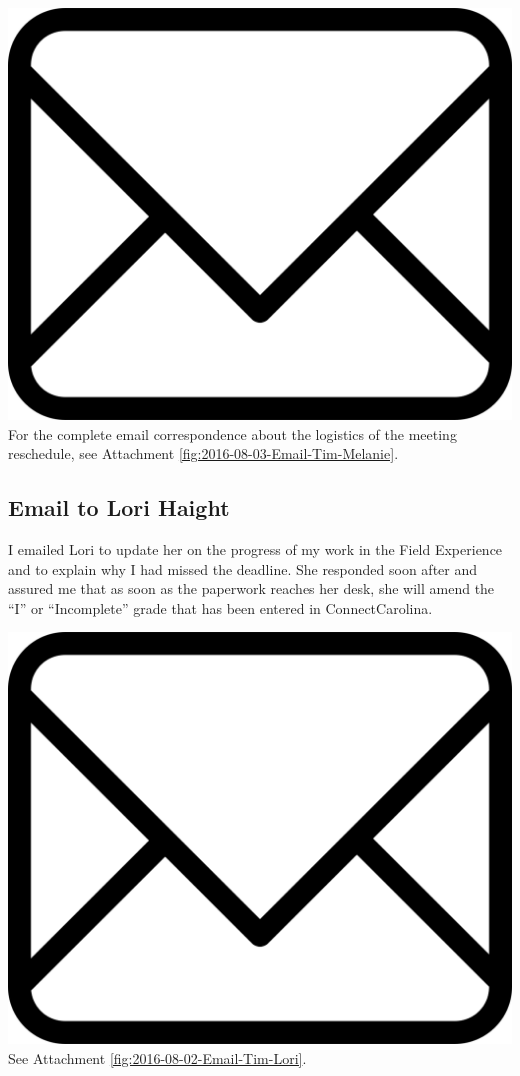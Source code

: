 \documentclass{article}
\begin{document}
\vspace{2em}
\noindent\includegraphics[height=\fontcharht\font`\B]{icons/attachment-email} For the complete email correspondence about the logistics of the meeting reschedule, see Attachment \ref{fig:2016-08-03-Email-Tim-Melanie}.
\vspace{2em}

\subsection{Email to Lori Haight}
I emailed Lori to update her on the progress of my work in the Field Experience and to explain why I had missed the deadline. She responded soon after and assured me that as soon as the paperwork reaches her desk, she will amend the ``I'' or ``Incomplete'' grade that has been entered in ConnectCarolina.

\vspace{2em}
\noindent\includegraphics[height=\fontcharht\font`\B]{icons/attachment-email} See Attachment \ref{fig:2016-08-02-Email-Tim-Lori}.
\vspace{2em}
\end{document}

